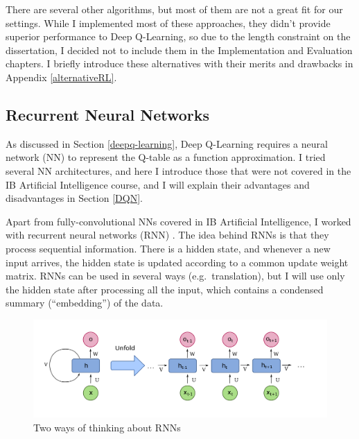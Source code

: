 There are several other algorithms, but most of them are not a great fit for our settings. While I implemented most of these approaches, they didn't provide superior performance to Deep Q-Learning, so due to the length constraint on the dissertation, I decided not to include them in the Implementation and Evaluation chapters. I briefly introduce these alternatives with their merits and drawbacks in Appendix \ref{alternativeRL}. 


\subsection{Recurrent Neural Networks} \label{RNN}


As discussed in Section \ref{deepq-learning}, Deep Q-Learning requires a neural network (NN) to represent the Q-table as a function approximation. I tried several NN architectures, and here I introduce those that were not covered in the IB Artificial Intelligence course, and I will explain their advantages and disadvantages in Section \ref{DQN}. 

Apart from fully-convolutional NNs covered in IB Artificial Intelligence, I worked with recurrent neural networks (RNN) \cite{hopfield1982RNNoriginal}. The idea behind RNNs is that they process sequential information. There is a hidden state, and whenever a new input arrives, the hidden state is updated according to a common update weight matrix. RNNs can be used in several ways (e.g.\ translation), but I will use only the hidden state after processing all the input, which contains a condensed summary (``embedding'') of the data.


\begin{figure}[hbt!] \label{RNN-image}
    \centering
    \includegraphics[scale=0.2]{Chapter2/Figs/RNN.png}
    \caption{Two ways of thinking about RNNs \cite{RNN}}
\end{figure}



